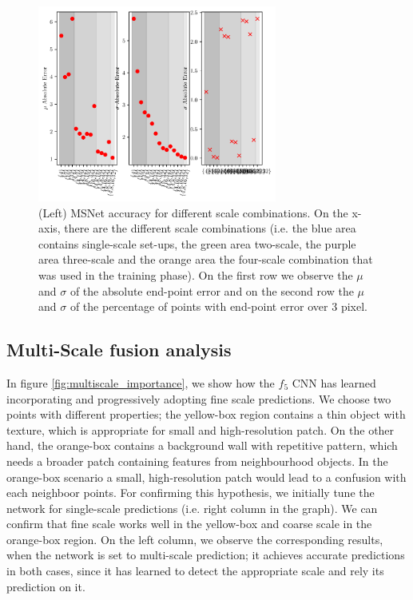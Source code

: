 \documentclass[runningheads]{llncs}
\begin{document}
\begin{figure}[htb!]
    \centering
    \includegraphics[width=0.7\textwidth]{figures/msnet_scales_evaluation.pdf}
    \caption{(Left) MSNet accuracy for different scale combinations. On the x-axis, there are the different scale combinations (i.e. the blue area contains single-scale set-ups, the green area two-scale, the purple area three-scale and the orange area the four-scale combination that was used in the training phase). On the first row we observe the $\mu$ and $\sigma$ of the absolute end-point error and on the second row the $\mu$ and $\sigma$ of the percentage of points with end-point error over 3 pixel.}
    \label{fig:msnet_scales_evaluation}

\end{figure}

\subsection{Multi-Scale fusion analysis} \label{sec:4_1}

In figure \ref{fig:multiscale_importance}, we show how the $f_5$ CNN has learned incorporating and progressively adopting fine scale predictions. We choose two points with different properties; the yellow-box region contains a thin object with texture, which is appropriate for small and high-resolution patch. On the other hand, the orange-box contains a background wall with repetitive pattern, which needs a broader patch containing features from neighbourhood objects. In the orange-box scenario a small, high-resolution patch would lead to a confusion with each neighboor points. For confirming this hypothesis, we initially tune the network for single-scale predictions (i.e. right column in the graph). We can confirm that fine scale works well in the yellow-box and coarse scale in the orange-box region. On the left column, we observe the corresponding results, when the network is set to multi-scale prediction; it achieves accurate predictions in both cases, since it has learned to detect the appropriate scale and rely its prediction on it.
\end{document}
